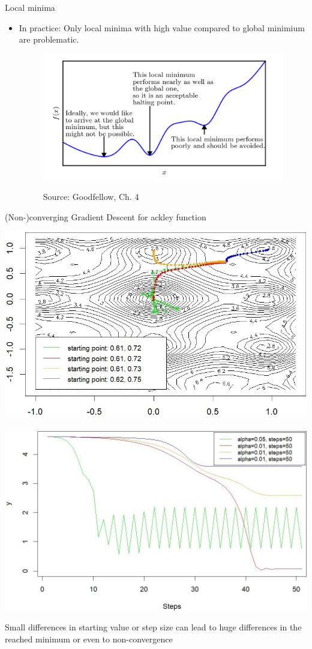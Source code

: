 \documentclass[11pt,compress,t,notes=noshow, xcolor=table]{beamer}
\begin{document}
\begin{vbframe} {Local minima}

\begin{itemize}
\item In practice: Only local minima with high value compared to global minimium are problematic.
\begin{figure}
\begin{center}
	\includegraphics[width=.6\textwidth]{figure_man/minima.png}
\end{center}
\tiny{Source: Goodfellow, Ch. 4}
\end{figure}
\end{itemize}

\framebreak

\begin{center}
\vspace{1cm}
(Non-)converging Gradient Descent for ackley function
\end{center}


\includegraphics[width=.45\textwidth]{figure_man/nonconv_ackley_plot.jpg} ~~
\includegraphics[width=.49\textwidth]{figure_man/nonconv_ackley_path.jpg}


\footnotesize{Small differences in starting value or step size can lead to huge differences in the reached minimum or even to non-convergence}

\end{vbframe}
\end{document}
